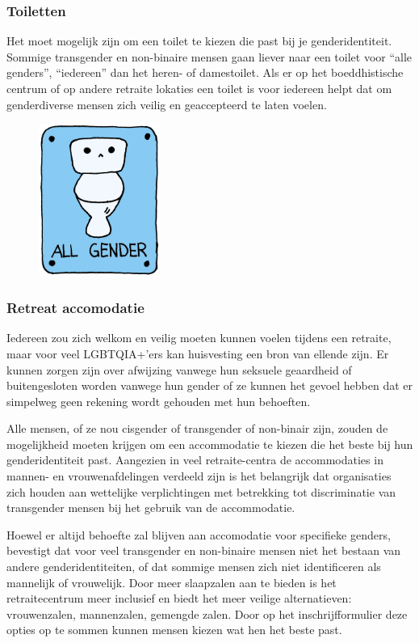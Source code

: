 \documentclass[12pt,openany]{book}
\begin{document}
\subsubsection*{Toiletten}

Het moet mogelijk zijn om een toilet te kiezen die past bij je genderidentiteit. Sommige transgender en non-binaire mensen gaan liever naar een toilet voor “alle genders”, “iedereen” dan het heren- of damestoilet. Als er op het boeddhistische centrum of op andere retraite lokaties een toilet is voor iedereen helpt dat om genderdiverse mensen zich veilig en geaccepteerd te laten voelen.

\begin{figure}[h]
\includegraphics[width=4cm]{16.png}
\centering
\end{figure}

\subsubsection*{Retreat accomodatie}

Iedereen zou zich welkom en veilig moeten kunnen voelen tijdens een retraite, maar voor veel LGBTQIA+’ers kan huisvesting een bron van ellende zijn. Er kunnen zorgen zijn over afwijzing vanwege hun seksuele geaardheid of buitengesloten worden vanwege hun gender of ze kunnen het gevoel hebben dat er simpelweg geen rekening wordt gehouden met hun behoeften. 

Alle mensen, of ze nou cisgender of transgender of non-binair zijn, zouden de mogelijkheid moeten krijgen om een accommodatie te kiezen die het beste bij hun genderidentiteit past.  Aangezien in veel retraite-centra de accommodaties in mannen- en vrouwenafdelingen verdeeld zijn is het belangrijk dat organisaties zich houden aan wettelijke verplichtingen met betrekking tot discriminatie van transgender mensen bij het gebruik van de accommodatie.

Hoewel er altijd behoefte zal blijven aan accomodatie voor specifieke genders, bevestigt dat voor veel transgender en non-binaire mensen niet het bestaan van andere genderidentiteiten, of dat sommige mensen zich niet identificeren als mannelijk of vrouwelijk. Door meer slaapzalen aan te bieden is het retraitecentrum meer inclusief en biedt het meer veilige alternatieven: vrouwenzalen, mannenzalen, gemengde zalen. Door op het inschrijfformulier deze opties op te sommen kunnen mensen kiezen wat hen het beste past.
\end{document}
